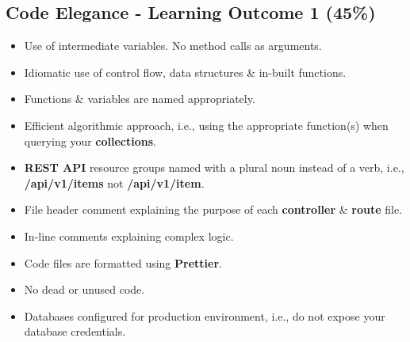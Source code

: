 \documentclass{article}
\begin{document}
\subsection*{Code Elegance - Learning Outcome 1 (45\%)}
\begin{itemize}
    \item Use of intermediate variables. No method calls as arguments.
    \item Idiomatic use of control flow, data structures \& in-built functions.
    \item Functions \& variables are named appropriately.
    \item Efficient algorithmic approach, i.e., using the appropriate function(s) when querying your \textbf{collections}.
    \item \textbf{REST API} resource groups named with a plural noun instead of a verb, i.e., \textbf{/api/v1/items} not \textbf{/api/v1/item}. 
    \item File header comment explaining the purpose of each \textbf{controller} \& \textbf{route} file.
    \item In-line comments explaining complex logic.
    \item Code files are formatted using \textbf{Prettier}.
    \item No dead or unused code.
    \item Databases configured for production environment, i.e., do not expose your database credentials.
\end{itemize} 
\end{document}
